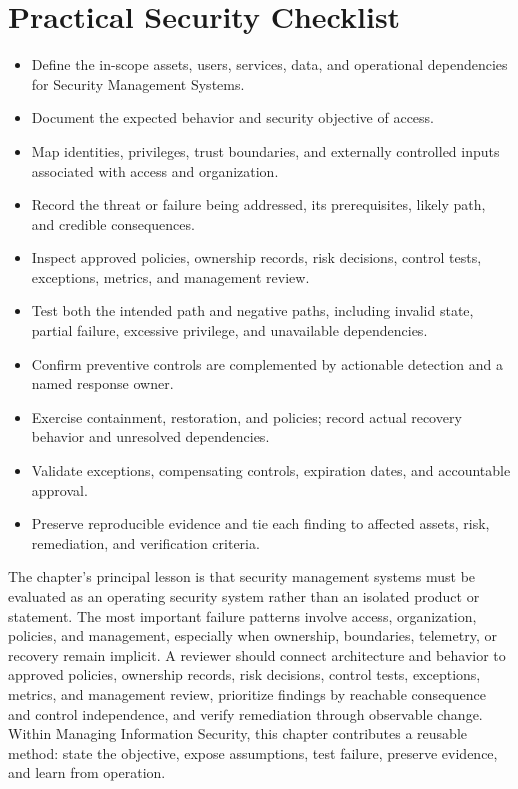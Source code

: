 \documentclass[11pt]{article}
\begin{document}
\section*{Practical Security Checklist}
\begin{itemize}[label=$\square$]
\item Define the in-scope assets, users, services, data, and operational dependencies for Security Management Systems.
\item Document the expected behavior and security objective of access.
\item Map identities, privileges, trust boundaries, and externally controlled inputs associated with access and organization.
\item Record the threat or failure being addressed, its prerequisites, likely path, and credible consequences.
\item Inspect approved policies, ownership records, risk decisions, control tests, exceptions, metrics, and management review.
\item Test both the intended path and negative paths, including invalid state, partial failure, excessive privilege, and unavailable dependencies.
\item Confirm preventive controls are complemented by actionable detection and a named response owner.
\item Exercise containment, restoration, and policies; record actual recovery behavior and unresolved dependencies.
\item Validate exceptions, compensating controls, expiration dates, and accountable approval.
\item Preserve reproducible evidence and tie each finding to affected assets, risk, remediation, and verification criteria.
\end{itemize}
\begin{synthesisbox}
The chapter's principal lesson is that security management systems must be evaluated as an operating security system rather than an isolated product or statement. The most important failure patterns involve access, organization, policies, and management, especially when ownership, boundaries, telemetry, or recovery remain implicit. A reviewer should connect architecture and behavior to approved policies, ownership records, risk decisions, control tests, exceptions, metrics, and management review, prioritize findings by reachable consequence and control independence, and verify remediation through observable change. Within Managing Information Security, this chapter contributes a reusable method: state the objective, expose assumptions, test failure, preserve evidence, and learn from operation.
\end{synthesisbox}
\end{document}
